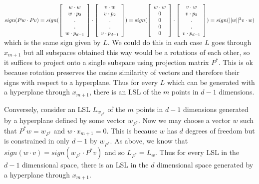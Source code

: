\documentclass[]{article}
\begin{document}
$sign(Pw \cdot Pv) = 
sign(
\left[
\begin{array}{c}
w \cdot w \\
w \cdot p_2\\
.\\
.\\
w \cdot p_{d-1}\\
\end{array}
\right]
\cdot
\left[
\begin{array}{c}
v \cdot w \\
v \cdot p_2\\
.\\
.\\
v \cdot p_{d-1}\\
\end{array}\\
\right]
)\\\\\\
=
sign(
\left[
\begin{array}{c}
w \cdot w \\
0\\
0\\
0\\
0
\end{array}
\right]
\cdot
\left[
\begin{array}{c}
v \cdot w \\
v \cdot p_2\\
.\\
.\\
v \cdot p_{d-1}\\
\end{array}
\right])\\\\\\
= sign(||w||^2 v \cdot w)
$\\
which is the same sign given by $L$. We could do this in each case $L$ goes through $x_{m+1}$ but all subspaces obtained this way would be a rotations of each other, so it suffices to project onto a single subspace using projection matrix $P^*$. This is ok because rotation preserves the cosine similarity of vectors and therefore their signs with respect to a hyperplane. Thus for every $L$ which can be generated with a hyperplane through $x_{m+1}$, there is an LSL of the $m$ points in $d-1$ dimensions.

Conversely, consider an LSL $L_{w_{P^*}}$ of the $m$ points in $d-1$ dimensions generated by a hyperplane defined by some vector $w_{P^*}$. Now we may choose a vector $w$ such that $P^* w = w_{P^*}$ and $w \cdot x_{m+1} = 0$. This is because $w$ has $d$ degrees of freedom but is constrained in only $d-1$ by $w_{P^*}$. As above, we know that $sign(w \cdot v) = sign(w_{P^*} \cdot P^*v)$ and so $L_{P^*} = L_{w}$. Thus for every LSL in the $d-1$ dimensional space, there is an LSL in the $d$ dimensional space generated by a hyperplane through $x_{m+1}$. 
\end{document}
